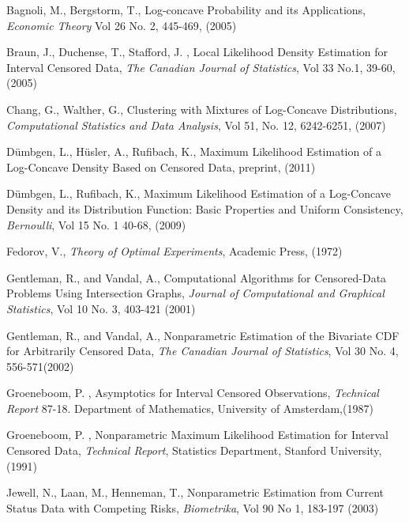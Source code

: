 \begin{thebibliography}{}
%
%
Bagnoli, M., Bergstorm, T., Log-concave Probability and its Applications, \emph{Economic Theory} Vol 26 No. 2, 445-469, (2005)

Braun, J., Duchense, T., Stafford, J. , Local Likelihood Density Estimation for Interval Censored Data, \emph{The Canadian Journal of Statistics}, Vol 33 No.1, 39-60,(2005)

Chang, G., Walther, G., Clustering with Mixtures of Log-Concave Distributions, \emph{Computational Statistics and Data Analysis}, Vol 51, No. 12, 6242-6251, (2007)

D\"umbgen, L., H\"usler, A., Rufibach, K., Maximum Likelihood Estimation of a Log-Concave Density Based on Censored Data, preprint, (2011)

D\"umbgen, L., Rufibach, K., Maximum Likelihood Estimation of a Log-Concave Density and its Distribution Function: Basic Properties and Uniform Consistency, \emph{Bernoulli}, Vol 15 No. 1 40-68, (2009)

Fedorov, V., \emph{Theory of Optimal Experiments}, Academic Press, (1972) 

Gentleman, R., and Vandal, A., Computational Algorithms for Censored-Data Problems Using Intersection Graphs, \emph{Journal of Computational and Graphical Statistics}, Vol 10 No. 3, 403-421 (2001)


Gentleman, R., and Vandal, A., Nonparametric Estimation of the Bivariate CDF for Arbitrarily Censored Data, \emph{The Canadian Journal of Statistics}, Vol 30 No. 4, 556-571(2002)


Groeneboom, P. , Asymptotics for Interval Censored Observations, \emph{Technical Report} 87-18. Department of Mathematics, University of Amsterdam,(1987) 

Groeneboom, P. , Nonparametric Maximum Likelihood Estimation for Interval Censored Data, \emph{Technical Report}, Statistics Department, Stanford University,(1991)

Jewell, N., Laan, M., Henneman, T., Nonparametric Estimation from Current Status Data with Competing Risks, \emph{Biometrika}, Vol 90 No 1, 183-197 (2003)



\end{thebibliography}

